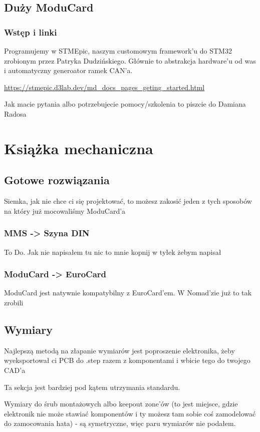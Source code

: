 \documentclass[b5paper, 10pt, twoside]{book}
\begin{document}
\section{Duży ModuCard}
\subsection{Wstęp i linki}

Programujemy w STMEpic, naszym customowym framework'u do STM32 zrobionym przez Patryka Dudzińskiego. Głównie to abstrakcja hardware'u od was i automatyczny generoator ramek CAN'a.


\url{https://stmepic.d3lab.dev/md_docs_pages_geting_started.html}

Jak macie pytania albo potrzebujecie pomocy/szkolenia to piszcie do Damiana Radosa

\chapter{Książka mechaniczna}
\section{Gotowe rozwiązania}
Siemka, jak nie chce ci się projektować, to możesz zakosić jeden z tych sposobów na który już mocowaliśmy ModuCard'a
\subsection{MMS -> Szyna DIN}
To Do. Jak nie napisałem tu nic to mnie kopnij w tyłek żebym napisał 
\subsection{ModuCard -> EuroCard}
ModuCard jest natywnie kompatybilny z EuroCard'em. W Nomad'zie już to tak zrobili

\section{Wymiary}
Najlepszą metodą na złapanie wymiarów jest poproszenie elektronika, żeby wyeksportował ci PCB do .step razem z komponentami i wbicie tego do twojego CAD'a

Ta sekcja jest bardziej pod kątem utrzymania standardu.

Wymiary do śrub montażowych albo keepout zone'ów (to jest miejsce, gdzie elektronik nie może stawiać komponentów i ty możesz tam sobie coś zamodelować do zamocowania hata) - są symetryczne, więc paru wymiarów nie podałem.
\end{document}
